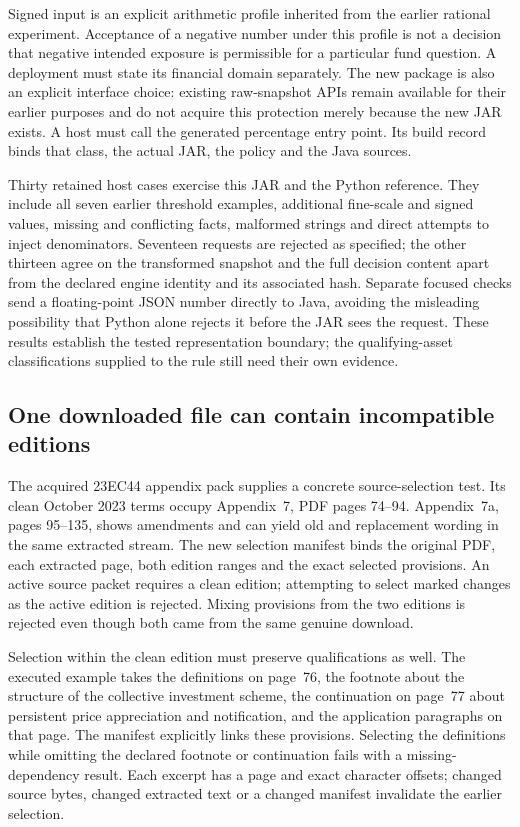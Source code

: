 \documentclass[12pt,a4paper,oneside,openany]{book}
\begin{document}
Signed input is an explicit arithmetic profile inherited from the earlier
rational experiment. Acceptance of a negative number under this profile is
not a decision that negative intended exposure is permissible for a particular
fund question. A deployment must state its financial domain separately. The
new package is also an explicit interface choice: existing raw-snapshot APIs
remain available for their earlier purposes and do not acquire this protection
merely because the new JAR exists. A host must call the generated percentage
entry point. Its build record binds that class, the actual JAR, the policy and
the Java sources.

Thirty retained host cases exercise this JAR and the Python reference. They
include all seven earlier threshold examples, additional fine-scale and signed
values, missing and conflicting facts, malformed strings and direct attempts
to inject denominators. Seventeen requests are rejected as specified; the
other thirteen agree on the transformed snapshot and the full decision content
apart from the declared engine identity and its associated hash. Separate
focused checks send a floating-point JSON number directly to Java, avoiding
the misleading possibility that Python alone rejects it before the JAR sees
the request. These results establish the tested representation boundary; the
qualifying-asset classifications supplied to the rule still need their own
evidence.

\subsection{One downloaded file can contain incompatible editions}

The acquired 23EC44 appendix pack supplies a concrete source-selection test.
Its clean October 2023 terms occupy Appendix~7, PDF pages 74--94. Appendix~7a,
pages 95--135, shows amendments and can yield old and replacement wording in
the same extracted stream. The new selection manifest binds the original PDF,
each extracted page, both edition ranges and the exact selected provisions.
An active source packet requires a clean edition; attempting to select marked
changes as the active edition is rejected. Mixing provisions from the two
editions is rejected even though both came from the same genuine download.

Selection within the clean edition must preserve qualifications as well. The
executed example takes the definitions on page~76, the footnote about the
structure of the collective investment scheme, the continuation on page~77
about persistent price appreciation and notification, and the application
paragraphs on that page. The manifest explicitly links these provisions.
Selecting the definitions while omitting the declared footnote or continuation
fails with a missing-dependency result. Each excerpt has a page and exact
character offsets; changed source bytes, changed extracted text or a changed
manifest invalidate the earlier selection.
\end{document}
